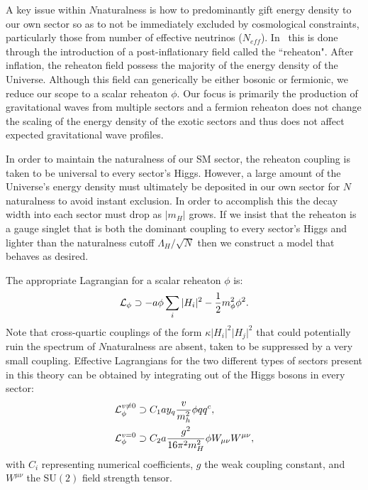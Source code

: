 \documentclass[nofootinbib,twocolumn,preprintnumbers]{revtex4-1}
\begin{document}
A key issue within $N$naturalness is how to predominantly gift energy density to our own sector so as to not be immediately excluded by cosmological constraints, particularly those from number of effective neutrinos ($N_{eff}$). In~\cite{Arkani-Hamed:2016rle} this is done through the introduction of a post-inflationary field called the ``reheaton". After inflation, the reheaton field possess the majority of the energy density of the Universe. Although this field can generically be either bosonic or fermionic, we reduce our scope to a scalar reheaton $\phi$. Our focus is primarily the production of gravitational waves from multiple sectors and a fermion reheaton does not change the scaling of the energy density of the exotic sectors and thus does not affect expected gravitational wave profiles.

In order to maintain the naturalness of our SM sector, the reheaton coupling is taken to be universal to every sector's Higgs. However, a large amount of the Universe's energy density must ultimately be deposited in our own sector for $N$naturalness to avoid instant exclusion. In order to accomplish this the decay width into each sector must drop as $\vert m_H\vert$ grows. If we insist that the reheaton is a gauge singlet that is both the dominant coupling to every sector's Higgs and lighter than the naturalness cutoff $\Lambda_H/\sqrt{N}$ then we construct a model that behaves as desired. 

The appropriate Lagrangian for a scalar reheaton $\phi$ is: 
\begin{equation}\label{eqn:nnLagrangian}
{\cal L}_\phi \supset -a\phi\sum_i\vert H_i\vert^2 - \frac{1}{2}m^2_\phi \phi^2.
\end{equation}
Note that cross-quartic couplings of the form $\kappa\vert H_i\vert^2\vert H_j\vert^2$ that could potentially ruin the spectrum of $N$naturalness are absent, taken to be suppressed by a very small coupling. Effective Lagrangians for the two different types of sectors present in this theory can be obtained by integrating out of the Higgs bosons in every sector:
\begin{equation}\label{eqn:nnEffLag}
\begin{split}
{\cal L}_\phi^{v \neq 0} &\supset C_1 a y_q\frac{v}{m_h^2}\phi q q^c,
\\
{\cal L}_\phi^{v = 0} &\supset C_2 a \frac{g^2}{16\pi^2 m_H^2}\phi W_{\mu\nu}W^{\mu\nu},
\end{split}
\end{equation}
with $C_i$ representing numerical coefficients, $g$ the weak coupling constant, and $W^{\mu\nu}$ the SU$(2)$ field strength tensor.
\end{document}
